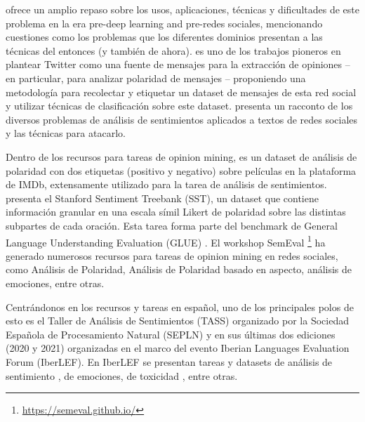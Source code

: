 \citet{pang2008opinion} ofrece un amplio repaso sobre los usos, aplicaciones, técnicas y dificultades de este problema en la era pre-deep learning and pre-redes sociales, mencionando cuestiones como los problemas que los diferentes dominios presentan a las técnicas del entonces (y también de ahora). \citet{pak2010twitter} es uno de los trabajos pioneros en plantear Twitter como una fuente de mensajes para la extracción de opiniones -- en particular, para analizar polaridad de mensajes -- proponiendo una metodología para recolectar y etiquetar un dataset de mensajes de esta red social y utilizar técnicas de clasificación sobre este dataset. \citet{yue2019survey} presenta un racconto de los diversos problemas de análisis de sentimientos aplicados a textos de redes sociales y las técnicas para atacarlo.

Dentro de los recursos para tareas de opinion mining, \citet{maas-EtAl:2011:ACL-HLT2011} es un dataset de análisis de polaridad con dos etiquetas (positivo y negativo) sobre películas en la plataforma de IMDb, extensamente utilizado para la tarea de análisis de sentimientos. \citet{socher-etal-2013-recursive} presenta el Stanford Sentiment Treebank (SST), un dataset que contiene información granular en una escala símil Likert de polaridad sobre las distintas subpartes de cada oración. Esta tarea forma parte del benchmark de General Language Understanding Evaluation (GLUE) \cite{wang-etal-2018-glue}. El workshop SemEval \footnote{\url{https://semeval.github.io/}} ha generado numerosos recursos para tareas de opinion mining en redes sociales, como Análisis de Polaridad, Análisis de Polaridad basado en aspecto, análisis de emociones, entre otras.

Centrándonos en los recursos y tareas en español, uno de los principales polos de esto es el Taller de Análisis de Sentimientos (TASS) \cite{overview_tass2018,garcia2020overview,cumbreras2016overview} organizado por la Sociedad Española de Procesamiento Natural (SEPLN) y en sus últimas dos ediciones (2020 y 2021) organizadas en el marco del evento Iberian Languages Evaluation Forum (IberLEF). En IberLEF se presentan tareas y datasets de análisis de sentimiento \cite{garcia2020overview}, de emociones\cite{plaza-del-arco-etal-2020-emoevent}, de toxicidad \cite{taule2021detoxis}, entre otras.


